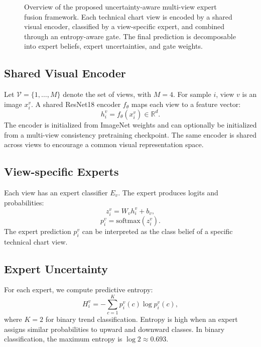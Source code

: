 ﻿\documentclass[conference]{IEEEtran}
\newcommand{\viewset}{\mathcal{V}}
\begin{document}
\begin{figure}[!t]
{%
}
\caption{Overview of the proposed uncertainty-aware multi-view expert fusion framework. Each technical chart view is encoded by a shared visual encoder, classified by a view-specific expert, and combined through an entropy-aware gate. The final prediction is decomposable into expert beliefs, expert uncertainties, and gate weights.}
\label{fig:method-overview}
\end{figure}

\subsection{Shared Visual Encoder}
Let $\viewset=\{1,\ldots,M\}$ denote the set of views, with $M=4$. For sample $i$, view $v$ is an image $x_i^v$. A shared ResNet18 encoder $f_\theta$ maps each view to a feature vector:
\begin{equation}
h_i^v = f_\theta(x_i^v) \in \mathbb{R}^{d}.
\end{equation}
The encoder is initialized from ImageNet weights and can optionally be initialized from a multi-view consistency pretraining checkpoint. The same encoder is shared across views to encourage a common visual representation space.

\subsection{View-specific Experts}
Each view has an expert classifier $E_v$. The expert produces logits and probabilities:
\begin{equation}
z_i^v = W_v h_i^v + b_v,
\end{equation}
\begin{equation}
p_i^v = \mathrm{softmax}(z_i^v).
\end{equation}
The expert prediction $p_i^v$ can be interpreted as the class belief of a specific technical chart view.

\subsection{Expert Uncertainty}
For each expert, we compute predictive entropy:
\begin{equation}
H_i^v = -\sum_{c=1}^{K} p_i^v(c)\log p_i^v(c),
\end{equation}
where $K=2$ for binary trend classification. Entropy is high when an expert assigns similar probabilities to upward and downward classes. In binary classification, the maximum entropy is $\log 2 \approx 0.693$.
\end{document}
